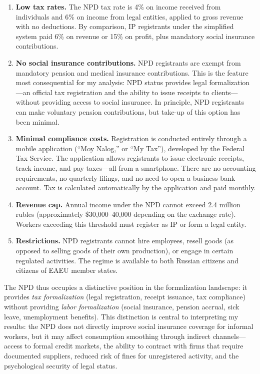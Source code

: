 \documentclass[12pt]{article}
\begin{document}
\begin{enumerate}
\item \textbf{Low tax rates.} The NPD tax rate is 4\% on income received from individuals and 6\% on income from legal entities, applied to gross revenue with no deductions. By comparison, IP registrants under the simplified system paid 6\% on revenue or 15\% on profit, plus mandatory social insurance contributions.

\item \textbf{No social insurance contributions.} NPD registrants are exempt from mandatory pension and medical insurance contributions. This is the feature most consequential for my analysis: NPD status provides legal formalization---an official tax registration and the ability to issue receipts to clients---without providing access to social insurance. In principle, NPD registrants can make voluntary pension contributions, but take-up of this option has been minimal.

\item \textbf{Minimal compliance costs.} Registration is conducted entirely through a mobile application (``Moy Nalog,'' or ``My Tax''), developed by the Federal Tax Service. The application allows registrants to issue electronic receipts, track income, and pay taxes---all from a smartphone. There are no accounting requirements, no quarterly filings, and no need to open a business bank account. Tax is calculated automatically by the application and paid monthly.

\item \textbf{Revenue cap.} Annual income under the NPD cannot exceed 2.4 million rubles (approximately \$30,000--40,000 depending on the exchange rate). Workers exceeding this threshold must register as IP or form a legal entity.

\item \textbf{Restrictions.} NPD registrants cannot hire employees, resell goods (as opposed to selling goods of their own production), or engage in certain regulated activities. The regime is available to both Russian citizens and citizens of EAEU member states.
\end{enumerate}

\noindent The NPD thus occupies a distinctive position in the formalization landscape: it provides \textit{tax formalization} (legal registration, receipt issuance, tax compliance) without providing \textit{labor formalization} (social insurance, pension accrual, sick leave, unemployment benefits). This distinction is central to interpreting my results: the NPD does not directly improve social insurance coverage for informal workers, but it may affect consumption smoothing through indirect channels---access to formal credit markets, the ability to contract with firms that require documented suppliers, reduced risk of fines for unregistered activity, and the psychological security of legal status.
\end{document}
